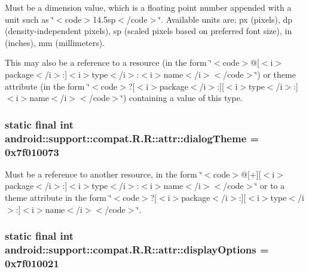 Must be a dimension value, which is a floating point number appended with a unit such as \char`\"{}$<$code$>$14.5sp$<$/code$>$\char`\"{}. Available units are: px (pixels), dp (density-independent pixels), sp (scaled pixels based on preferred font size), in (inches), mm (millimeters). 

This may also be a reference to a resource (in the form \char`\"{}$<$code$>$@\mbox{[}$<$i$>$package$<$/i$>$:\mbox{]}$<$i$>$type$<$/i$>$:$<$i$>$name$<$/i$>$$<$/code$>$\char`\"{}) or theme attribute (in the form \char`\"{}$<$code$>$?\mbox{[}$<$i$>$package$<$/i$>$:\mbox{]}\mbox{[}$<$i$>$type$<$/i$>$:\mbox{]}$<$i$>$name$<$/i$>$$<$/code$>$\char`\"{}) containing a value of this type. \hypertarget{classandroid_1_1support_1_1compat_1_1_r_1_1attr_20852d267d6642b12c5513168c6c2832}{
\subsubsection[{dialogTheme}]{\setlength{\rightskip}{0pt plus 5cm}static final int android::support::compat.R.R::attr::dialogTheme = 0x7f010073}}
\label{classandroid_1_1support_1_1compat_1_1_r_1_1attr_20852d267d6642b12c5513168c6c2832}


Must be a reference to another resource, in the form \char`\"{}$<$code$>$@\mbox{[}+\mbox{]}\mbox{[}$<$i$>$package$<$/i$>$:\mbox{]}$<$i$>$type$<$/i$>$:$<$i$>$name$<$/i$>$$<$/code$>$\char`\"{} or to a theme attribute in the form \char`\"{}$<$code$>$?\mbox{[}$<$i$>$package$<$/i$>$:\mbox{]}\mbox{[}$<$i$>$type$<$/i$>$:\mbox{]}$<$i$>$name$<$/i$>$$<$/code$>$\char`\"{}. \hypertarget{classandroid_1_1support_1_1compat_1_1_r_1_1attr_9741028e15a2ec181036a23a23364ce3}{
\subsubsection[{displayOptions}]{\setlength{\rightskip}{0pt plus 5cm}static final int android::support::compat.R.R::attr::displayOptions = 0x7f010021}}
\label{classandroid_1_1support_1_1compat_1_1_r_1_1attr_9741028e15a2ec181036a23a23364ce3}


